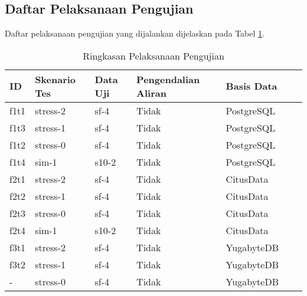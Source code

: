 \subsection{Daftar Pelaksanaan Pengujian}

Daftar pelaksanaan pengujian yang dijalankan dijelaskan pada Tabel \ref{tab:execution-summary}.

\begin{table}[htbp]
    \centering
    \caption{Ringkasan Pelaksanaan Pengujian}
    \label{tab:execution-summary}
    \begin{tabular}{|l|l|l|l|l|l|l|}
        \hline
        \textbf{ID} & \textbf{Skenario Tes} & \textbf{Data Uji} & \textbf{Pengendalian Aliran} & \textbf{Basis Data} \\ \hline
        f1t1        & stress-2              & sf-4              & Tidak                        & PostgreSQL          \\ \hline
        f1t3        & stress-1              & sf-4              & Tidak                        & PostgreSQL          \\ \hline
        f1t2        & stress-0              & sf-4              & Tidak                        & PostgreSQL          \\ \hline
        f1t4        & sim-1                 & s10-2             & Tidak                        & PostgreSQL          \\ \hline
        f2t1        & stress-2              & sf-4              & Tidak                        & CitusData           \\ \hline
        f2t2        & stress-1              & sf-4              & Tidak                        & CitusData           \\ \hline
        f2t3        & stress-0              & sf-4              & Tidak                        & CitusData           \\ \hline
        f2t4        & sim-1                 & s10-2             & Tidak                        & CitusData           \\ \hline
        f3t1        & stress-2              & sf-4              & Tidak                        & YugabyteDB          \\ \hline
        f3t2        & stress-1              & sf-4              & Tidak                        & YugabyteDB          \\ \hline
        -           & stress-0              & sf-4              & Tidak                        & YugabyteDB          \\ \hline

\end{tabular}
\end{table}
